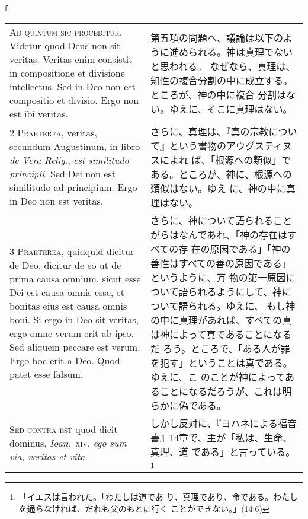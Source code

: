 \\f\documentclass[10pt]{jsarticle} %
\begin{document}
\begin{longtable}{p{21em}p{21em}}

{\huge A}{\scshape d quintum sic proceditur}. Videtur quod Deus non
 sit veritas. Veritas enim consistit in compositione et divisione
 intellectus. Sed in Deo non est compositio et divisio. Ergo non est
 ibi veritas.


&

第五項の問題へ、議論は以下のように進められる。神は真理でないと思われる。
なぜなら、真理は、知性の複合分割の中に成立する。ところが、神の中に複合
分割はない。ゆえに、そこに真理はない。

\\

{\scshape 2 Praeterea}, veritas, secundum Augustinum, in libro
 {\itshape de Vera Relig}., {\itshape est similitudo principii}. Sed
 Dei non est similitudo ad principium. Ergo in Deo non est veritas.


&

さらに、真理は、『真の宗教について』という書物のアウグスティヌスによれ
 ば、「根源への類似」である。ところが、神に、根源への類似はない。ゆえ
 に、神の中に真理はない。

\\

{\scshape 3 Praeterea}, quidquid dicitur de Deo, dicitur de eo ut de
 prima causa omnium, sicut esse Dei est causa omnis esse, et bonitas
 eius est causa omnis boni. Si ergo in Deo sit veritas, ergo omne
 verum erit ab ipso. Sed aliquem peccare est verum. Ergo hoc erit a
 Deo. Quod patet esse falsum.

&

さらに、神について語られることがらはなんであれ、「神の存在はすべての存
 在の原因である」「神の善性はすべての善の原因である」というように、万
 物の第一原因について語られるようにして、神について語られる。ゆえに、
 もし神の中に真理があれば、すべての真は神によって真であることになるだ
 ろう。ところで、「ある人が罪を犯す」ということは真である。ゆえに、こ
 のことが神によってあることになるだろうが、これは明らかに偽である。

\\


{\scshape Sed contra est} quod dicit dominus, {\itshape
Ioan}.~{\scshape xiv}, {\itshape ego sum via, veritas et vita}.


&

しかし反対に、『ヨハネによる福音書』14章で、主が「私は、生命、真理、道
 である」と言っている。\footnote{「イエスは言われた。「わたしは道であ
 り、真理であり、命である。わたしを通らなければ、だれも父のもとに行く
 ことができない。」(14:6)}



\end{longtable}
\end{document}
